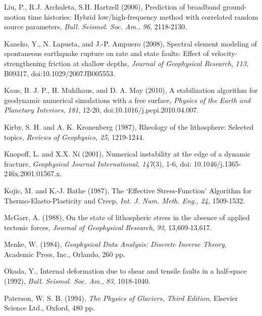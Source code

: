 \documentclass{pylithdoc}
\begin{document}
\begin{thebibliography}{widestentry}
Liu, P., R.J. Archuleta,
S.H. Hartzell (2006), Prediction of broadband ground-motion time histories:
Hybrid low/high-frequency method with correlated random source parameters,
\textit{Bull. Seismol. Soc. Am., 96}, 2118-2130.

Kaneko, Y., N. Lapusta,
and J.-P. Ampuero (2008), Spectral element modeling of spontaneous
earthquake rupture on rate and state faults: Effect of velocity-strengthening
friction at shallow depths, \textit{Journal of Geophysical Research},\textit{
113}, B09317, doi:10.1029/2007JB005553.

Kaus, B. J. P., H. Muhlhaus,
and D. A. May (2010), A stabilization algorithm for geodynamic numerical
simulations with a free surface, \textit{Physics of the Earth and
Planetary Interiors}, \textit{181}, 12-20, doi:10.1016/j.pepi.2010.04.007.

Kirby,
S. H. and A. K. Kronenberg (1987), Rheology of the lithosphere: Selected
topics, \textit{Reviews of Geophysics, 25}, 1219-1244.

Knopoff, L. and X.X.
Ni (2001), Numerical instability at the edge of a dynamic fracture,
\emph{Geophysical Journal International,}\textit{\emph{ }}\textit{147}(3),
1-6, doi: 10.1046/j.1365-246x.2001.01567.x.

Kojic, M. and K.-J.
Bathe (1987), The `Effective Stress-Function' Algorithm for Thermo-Elasto-Plasticity
and Creep, \emph{Int. J. Num. Meth. Eng}.\emph{, 24}, 1509-1532.

McGarr, A. (1988), On the state
of lithospheric stress in the absence of applied tectonic forces,
\textit{Journal of Geophysical Research}, \textit{93}, 13,609-13,617.

Menke, W. (1984), \textit{Geophysical
Data Analysis: Discrete Inverse Theory}, Academic Press, Inc., Orlando,
260 pp.

Okada, Y., Internal deformation
due to shear and tensile faults in a half-space (1992), \textit{Bull.
Seismol. Soc. Am.}, \textit{83}, 1018-1040.

Paterson, W. S. B. (1994),
\textit{The Physics of Glaciers, Third Edition}, Elsevier Science
Ltd., Oxford, 480 pp.


\end{thebibliography}
\end{document}
